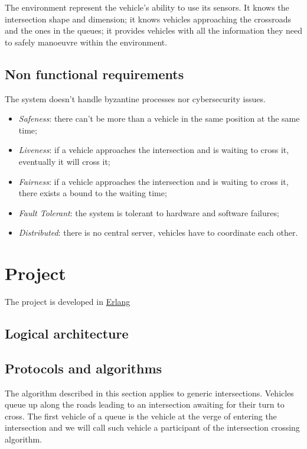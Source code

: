 \documentclass{memoir}
\begin{document}
The environment represent the vehicle's ability to use its sensors. It knows the intersection shape and dimension; it knows vehicles approaching the crossroads and the ones in the queues; it provides vehicles with all the information they need to safely manoeuvre within the environment.

\section{Non functional requirements}
The system doesn't handle byzantine processes nor cybersecurity issues.

\begin{itemize}
	\item \emph{Safeness}: there can't be more than a vehicle in the same position at the same time;
	\item \emph{Liveness}: if a vehicle approaches the intersection and is waiting to cross it, eventually it will cross it;
	\item \emph{Fairness}: if a vehicle approaches the intersection and is waiting to cross it, there exists a bound to the waiting time;
	\item \emph{Fault Tolerant}: the system is tolerant to hardware and software failures;
	\item \emph{Distributed}: there is no central server, vehicles have to coordinate each other.
\end{itemize}



\chapter{Project}\label{ch:project}

The project is developed in \href{https://www.erlang.org/}{Erlang}

\section{Logical architecture}

\section{Protocols and algorithms}

The algorithm described in this section applies to generic intersections. Vehicles queue up along the roads leading to an intersection awaiting for their turn to cross. The first vehicle of a queue is the vehicle at the verge of entering the intersection and we will call such vehicle a participant of the intersection crossing algorithm.
\end{document}
